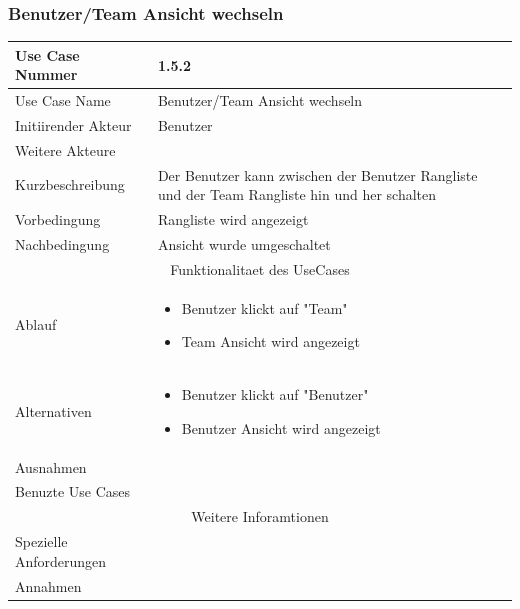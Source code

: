 \documentclass[10pt,a4paper]{article}
\begin{document}
	\subsubsection{Benutzer/Team Ansicht wechseln}
		\begin{tabular}{|l|p{.5\linewidth}|}
		\hline Use Case Nummer & 1.5.2 \\ 
		\hline Use Case Name & Benutzer/Team Ansicht wechseln \\ 
		\hline Initiirender Akteur & Benutzer \\
		\hline Weitere Akteure &  \\
		\hline Kurzbeschreibung & Der Benutzer kann zwischen der Benutzer Rangliste und der Team Rangliste hin und her schalten \\
		\hline Vorbedingung & Rangliste wird angezeigt \\
		\hline Nachbedingung & Ansicht wurde umgeschaltet \\
		\hline \multicolumn{2}{|c|}{Funktionalitaet des UseCases}\\
		\hline Ablauf & \begin{itemize}
			\item Benutzer klickt auf "Team"
			\item Team Ansicht wird angezeigt
		\end{itemize} \\
		\hline Alternativen & \begin{itemize}
					\item Benutzer klickt auf "Benutzer"
					\item Benutzer Ansicht wird angezeigt
				\end{itemize} \\
		\hline Ausnahmen &  \\
		\hline Benuzte Use Cases &  \\
		\hline \multicolumn{2}{|c|}{Weitere Inforamtionen} \\
		\hline Spezielle Anforderungen &  \\
		\hline Annahmen &  \\
		\hline
		\end{tabular}
		
\end{document}
